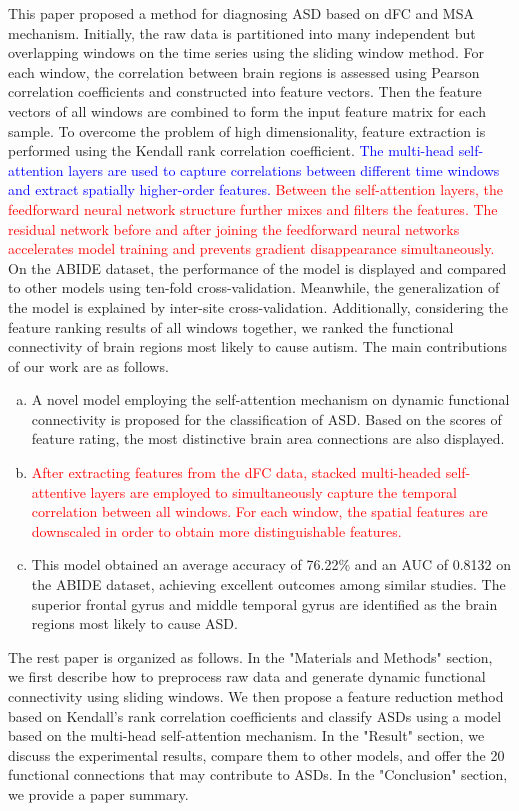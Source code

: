 \documentclass[a4paper]{cas-dc}
\begin{document}
This paper proposed a method for diagnosing ASD based on dFC and MSA mechanism. Initially, the raw data is partitioned into many independent but overlapping  windows on the time series using the sliding window method. For each window, the correlation between brain regions is assessed using Pearson correlation coefficients and constructed into feature vectors. Then the feature vectors of all windows are combined to form the input feature matrix for each sample. To overcome the problem of high dimensionality, feature extraction is performed using the Kendall rank correlation coefficient. \textcolor{blue}{The multi-head self-attention layers are used to capture correlations between different time windows and extract spatially higher-order features.} \textcolor{red}{Between the self-attention layers, the feedforward neural network structure further mixes and filters the features. The residual network before and after joining the feedforward neural networks accelerates model training and prevents gradient disappearance simultaneously.} On the ABIDE dataset, the performance of the model is displayed and compared to other models using ten-fold cross-validation. Meanwhile, the generalization of the model is explained by inter-site cross-validation. Additionally, considering the feature ranking results of all windows together, we ranked the functional connectivity of brain regions most likely to cause autism. The main contributions of our work are as follows.
\begin{enumerate}[a)]
	\item A novel model employing the self-attention mechanism on dynamic functional connectivity is proposed for the classification of ASD. Based on the scores of feature rating, the most distinctive brain area connections are also displayed.
	\item \textcolor{red}{After extracting features from the dFC data, stacked multi-headed self-attentive layers are employed to simultaneously capture the temporal correlation between all windows. For each window, the spatial features are downscaled in order to obtain more distinguishable features.}
	\item This model obtained an average accuracy of 76.22\% and an AUC of 0.8132 on the ABIDE dataset, achieving excellent outcomes among similar studies. The superior frontal gyrus and middle temporal gyrus are identified as the brain regions most likely to cause ASD.
\end{enumerate}  

The rest paper is organized as follows. In the "Materials and Methods" section, we first describe how to preprocess raw data and generate dynamic functional connectivity using sliding windows. We then propose a feature reduction method based on Kendall's rank correlation coefficients and classify ASDs using a model based on the multi-head self-attention mechanism. In the "Result" section, we discuss the experimental results, compare them to other models, and offer the 20 functional connections that may contribute to ASDs. In the "Conclusion" section, we provide a paper summary.
\end{document}
